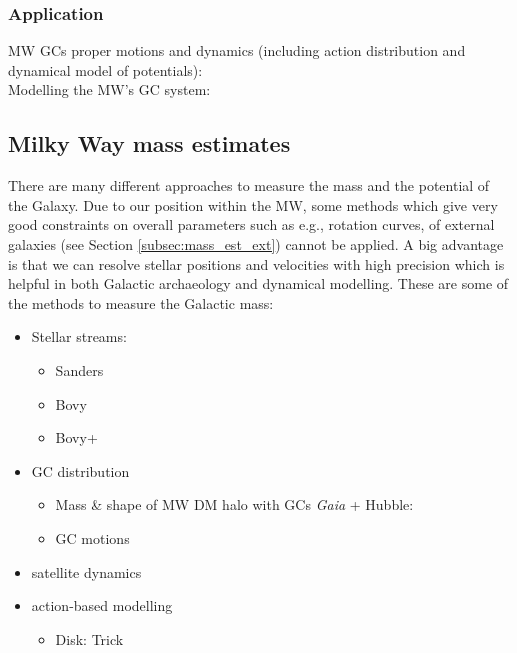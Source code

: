 \subsubsection{Application}
MW \acp{GC} proper motions and dynamics (including action distribution and dynamical model of potentials): \cite{Vasiliev...GCdynsGaiaDR2...2018}\\
Modelling the \ac{MW}'s \ac{GC} system: \cite{Binney...GCsystem...2017}



\subsection{Milky Way mass estimates}\label{subsec:mass_est_MW}
There are many different approaches to measure the mass and the potential of the Galaxy. Due to our position within the \ac{MW}, some methods which give very good constraints on overall parameters such as e.g., rotation curves, of external galaxies (see Section \ref{subsec:mass_est_ext}) cannot be applied. A big advantage is that we can resolve stellar positions and velocities with high precision which is helpful in both Galactic archaeology and dynamical modelling. These are some of the methods to measure the Galactic mass:
\begin{itemize}
    \item Stellar streams:
    \begin{itemize}
        \item Sanders \citep{Streams...Sanders...2014}
        \item Bovy \citep{Streams...Bovy...2014}
        \item Bovy+ \citep{Streams..GD1..Pal5...Bovy...2016}
    \end{itemize}
    \item \ac{GC} distribution 
    \begin{itemize}
        \item Mass \& shape of \ac{MW} \ac{DM} halo with \acp{GC} \textit{Gaia} + Hubble: \cite{Posti...MWmassGCs...2018}
        \item GC motions \citep{MWmass...GCmotions...Watkins...2018}
    \end{itemize}
    \item satellite dynamics \citep{MWmass...sat...dyn}
    \item action-based modelling
    \begin{itemize}
        \item Disk: Trick \citep{Wilmathesis}

    \end{itemize}
    
\end{itemize}



